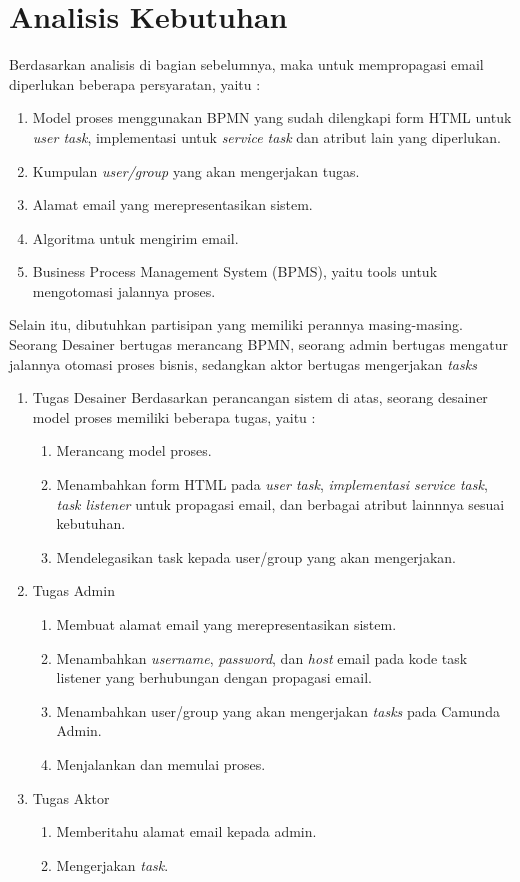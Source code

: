 \section{Analisis Kebutuhan}
\label{analisisdanperancangan_analisiskebutuhan}
Berdasarkan analisis di bagian sebelumnya, maka untuk mempropagasi email diperlukan beberapa persyaratan, yaitu :
\begin{enumerate}
	\item Model proses menggunakan BPMN yang sudah dilengkapi form HTML untuk \textit{user task}, implementasi untuk \textit{service task} dan atribut lain yang diperlukan.
	\item Kumpulan \textit{user/group} yang akan mengerjakan tugas.
	\item Alamat email yang merepresentasikan sistem.
	\item Algoritma untuk mengirim email.
	\item Business Process Management System (BPMS), yaitu tools untuk mengotomasi jalannya proses.
\end{enumerate}


Selain itu, dibutuhkan partisipan yang memiliki perannya masing-masing. Seorang Desainer bertugas merancang BPMN, seorang admin bertugas mengatur jalannya otomasi proses bisnis, sedangkan aktor bertugas mengerjakan \textit{tasks}

\begin{enumerate}
\item Tugas Desainer 
Berdasarkan perancangan sistem di atas, seorang desainer model proses memiliki beberapa tugas, yaitu :
\begin{enumerate}
	\item Merancang model proses.
	\item Menambahkan form HTML pada \textit{user task}, \textit{implementasi service task}, \textit{task listener} untuk propagasi email, dan berbagai atribut lainnnya sesuai kebutuhan.
	\item Mendelegasikan task kepada user/group yang akan mengerjakan.
\end{enumerate}

\item Tugas Admin
\begin{enumerate}
	\item Membuat alamat email yang merepresentasikan sistem.
	\item Menambahkan \textit{username}, \textit{password}, dan \textit{host} email pada kode task listener yang berhubungan dengan propagasi email.
	\item Menambahkan user/group yang akan mengerjakan \textit{tasks} pada Camunda Admin.
	\item Menjalankan dan memulai proses.
\end{enumerate}

\item Tugas Aktor
	\begin{enumerate}
	\item Memberitahu alamat email kepada admin.
	\item Mengerjakan \textit{task}.
\end{enumerate}

\end{enumerate}


